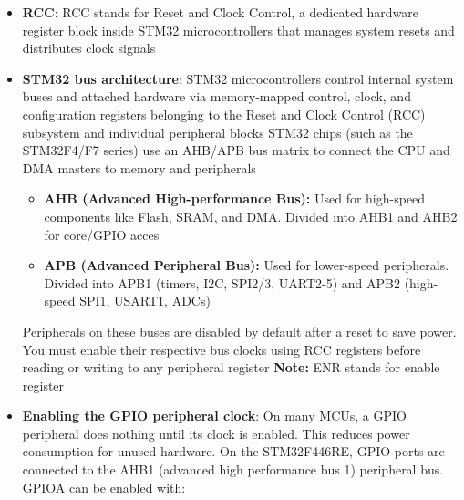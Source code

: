 \documentclass{report}
\begin{document}
\begin{itemize}
            \bigbreak \noindent 
            \begin{cppcode}
                if (GPIOC->IDR & (1U << 13)) {
                    // PC13 is high
                } else {
                    // PC13 is low
                }
            \end{cppcode}
            IDR contains one bit for each pin in the port. Reading IDR observes the pin’s actual digital input state. Reading ODR observes the value stored in the output latch. These values can differ under certain electrical conditions.
        \item \textbf{RCC}: RCC stands for Reset and Clock Control, a dedicated hardware register block inside STM32 microcontrollers that manages system resets and distributes clock signals
        \item \textbf{STM32 bus architecture}:  STM32 microcontrollers control internal system buses and attached hardware via memory-mapped control, clock, and configuration registers belonging to the Reset and Clock Control (RCC) subsystem and individual peripheral blocks
            \bigbreak \noindent 
            STM32 chips (such as the STM32F4/F7 series) use an AHB/APB bus matrix to connect the CPU and DMA masters to memory and peripherals
            \begin{itemize}
                \item \textbf{AHB (Advanced High-performance Bus):} Used for high-speed components like Flash, SRAM, and DMA. Divided into AHB1 and AHB2 for core/GPIO acces
                \item \textbf{APB (Advanced Peripheral Bus):} Used for lower-speed peripherals. Divided into APB1 (timers, I2C, SPI2/3, UART2-5) and APB2 (high-speed SPI1, USART1, ADCs)
            \end{itemize}
            Peripherals on these buses are disabled by default after a reset to save power. You must enable their respective bus clocks using RCC registers before reading or writing to any peripheral register
            \bigbreak \noindent 
            \textbf{Note:} ENR stands for enable register
        \item \textbf{Enabling the GPIO peripheral clock}: On many MCUs, a GPIO peripheral does nothing until its clock is enabled. This reduces power consumption for unused hardware.
            \bigbreak \noindent 
            On the STM32F446RE, GPIO ports are connected to the AHB1 (advanced high performance bus 1) peripheral bus. GPIOA can be enabled with:
            \bigbreak \noindent 
            \begin{cppcode}

\end{cppcode}
\end{itemize}
\end{document}
